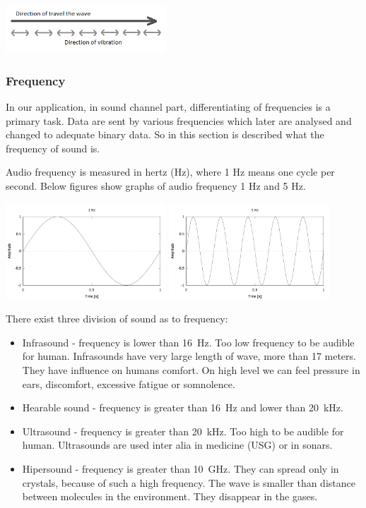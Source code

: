 \documentclass[11pt,titlepage]{article}
\theoremstyle{plain}
\begin{document}
\begin{center}
		\includegraphics[width=0.45\textwidth]{img/longitudinal_wave}
\end{center}
\subsubsection{Frequency}
In our application, in sound channel part, differentiating of frequencies is a primary task. Data are sent by various frequencies which later are analysed and changed to adequate binary data. So in this section is described what the frequency of sound is.

\vspace{5mm}

Audio frequency is measured in hertz (Hz), where 1 Hz means one cycle per second. Below figures show graphs of audio frequency 1 Hz and 5 Hz.


\begin{center}
	\includegraphics[width=0.45\textwidth]{img/frequency_1Hz}
	\includegraphics[width=0.45\textwidth]{img/frequency_5Hz}
\end{center}

There exist three division of sound as to frequency:
\begin{itemize}
	\item Infrasound - frequency is lower than 16~Hz. Too low frequency to be audible for human. Infrasounds have very large length of wave, more than 17 meters. They have influence on humans comfort. On high level we can feel pressure in ears, discomfort, excessive fatigue or somnolence.
	\item Hearable sound - frequency is greater than 16~Hz and lower than 20~kHz.
	\item Ultrasound - frequency is greater than 20~kHz. Too high to be audible for human. Ultrasounds are used inter alia in medicine (USG) or in sonars. 
	\item Hipersound - frequency is greater than 10~GHz. They can spread only in crystals, because of such a high frequency. The wave is smaller than distance between molecules in the environment. They disappear in the gases.
\end{itemize}
\end{document}
